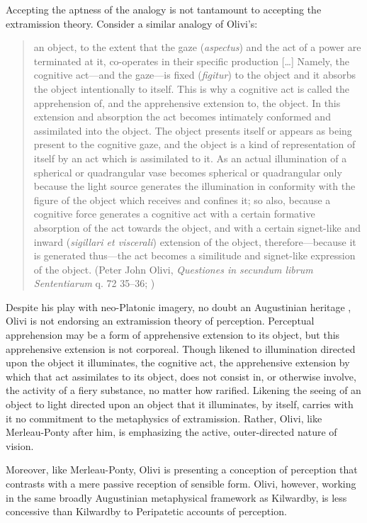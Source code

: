 Accepting the aptness of the analogy is not tantamount to accepting the extramission theory. Consider a similar analogy of Olivi's:
\begin{quote}
	an object, to the extent that the gaze (\emph{aspectus}) and the act of a power are terminated at it, co-operates in their specific production [\ldots] Namely, the cognitive act---and the gaze---is fixed (\emph{figitur}) to the object and it absorbs the object intentionally to itself. This is why a cognitive act is called the apprehension of, and the apprehensive extension to, the object. In this extension and absorption the act becomes intimately conformed and assimilated into the object. The object presents itself or appears as being present to the cognitive gaze, and the object is a kind of representation of itself by an act which is assimilated to it. As an actual illumination of a spherical or quadrangular vase becomes spherical or quadrangular only because the light source generates the illumination in conformity with the figure of the object which receives and confines it; so also, because a cognitive force generates a cognitive act with a certain formative absorption of the act towards the object, and with a certain signet-like and inward (\emph{sigillari et viscerali}) extension of the object, therefore---because it is generated thus---the act becomes a similitude and signet-like expression of the object. (Peter John Olivi, \emph{Questiones in secundum librum Sententiarum} q. 72 35--36; \citealt[146--147]{Toivanen:2013ul})
\end{quote}
Despite his play with neo-Platonic imagery, no doubt an Augustinian heritage \citep[198]{Kent:1984zm}, Olivi is not endorsing an extramission theory of perception. Perceptual apprehension may be a form of apprehensive extension to its object, but this apprehensive extension is not corporeal. Though likened to illumination directed upon the object it illuminates, the cognitive act, the apprehensive extension by which that act assimilates to its object, does not consist in, or otherwise involve, the activity of a fiery substance, no matter how rarified. Likening the seeing of an object to light directed upon an object that it illuminates, by itself, carries with it no commitment to the metaphysics of extramission. Rather, Olivi, like Merleau-Ponty after him, is emphasizing the active, outer-directed nature of vision.

Moreover, like Merleau-Ponty, Olivi is presenting a conception of perception that contrasts with a mere passive reception of sensible form. Olivi, however, working in the same broadly Augustinian metaphysical framework as Kilwardby, is less concessive than Kilwardby to Peripatetic accounts of perception. 

